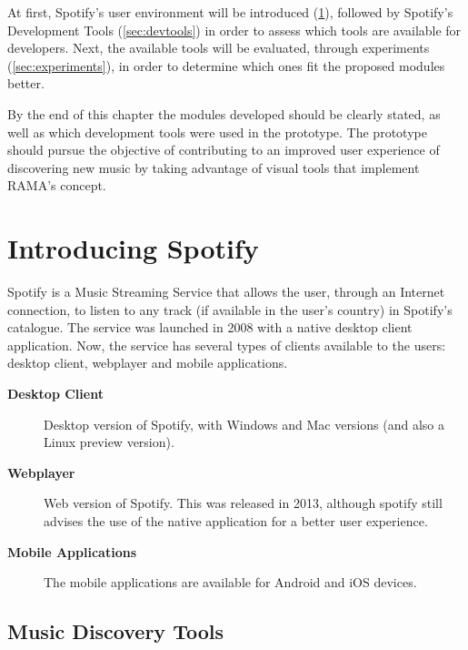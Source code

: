 At first, Spotify's user environment will be introduced (\ref{sec:spotify}), followed by Spotify's Development Tools (\ref{sec:devtools}) in order to assess which tools are available for developers.
Next, the available tools will be evaluated, through experiments (\ref{sec:experiments}), in order to determine which ones fit the proposed modules better.

By the end of this chapter the modules developed should be clearly stated, as well as which development tools were used in the prototype.
The prototype should pursue the objective of contributing to an improved user experience of discovering new music by taking advantage of visual tools that implement RAMA's concept.

\section{Introducing Spotify} %
\label{sec:spotify}


  Spotify is a Music Streaming Service that allows the user, through an Internet connection, to listen to any track (if available in the user's country) in Spotify's catalogue.
  The service was launched in 2008 with a native desktop client application.
  Now, the service has several types of clients available to the users: desktop client, webplayer and mobile applications.

  \begin{description}
    \item[\textbf{Desktop Client}] Desktop version of Spotify, with Windows and Mac versions (and also a Linux preview version).
    \item[\textbf{Webplayer}] Web version of Spotify. This was released in 2013, although spotify still advises the use of the native application for a better user experience.
    \item[\textbf{Mobile Applications}] The mobile applications are available for Android and iOS devices.
  \end{description}

  \subsection{Music Discovery Tools} %
  \label{sub:discovery_tools}
  


